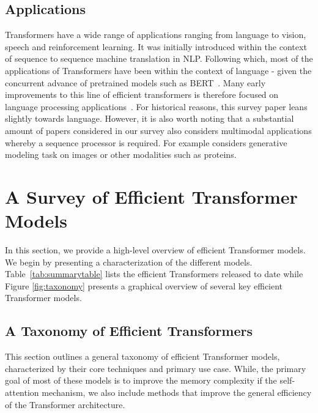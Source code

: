 \subsection{Applications}
Transformers have a wide range of applications ranging from language to vision, speech and reinforcement learning. It was initially introduced within the context of sequence to sequence machine translation in NLP. Following which, most of the applications of Transformers have been within the context of language - given the concurrent advance of pretrained models such as BERT~\citep{devlin2018bert}. Many early improvements to this line of efficient transformers is therefore focused on language processing applications~\citep{beltagy2020longformer,ainslie2020etc}. For historical reasons, this survey paper leans slightly towards language. However, it is also worth noting that a substantial amount of papers considered in our survey also considers multimodal applications whereby a sequence processor is required. For example \citet{roy2020efficient,choromanski2020rethinking,tay2020sparse,child2019generating} considers generative modeling task on images or other modalities such as proteins. 

\section{A Survey of Efficient Transformer Models}

In this section, we provide a high-level overview of efficient Transformer models. We begin by presenting a characterization of the different models. Table~\ref{tab:summarytable} lists the efficient Transformers released to date while Figure \ref{fig:taxonomy} presents a graphical overview of several key efficient Transformer models. 

\subsection{A Taxonomy of Efficient Transformers} This section outlines a general taxonomy of efficient Transformer models, characterized by their core techniques and primary use case. While, the primary goal of most of these models is to improve the memory complexity if the self-attention mechanism, we also include methods that improve the general efficiency of the Transformer architecture.

